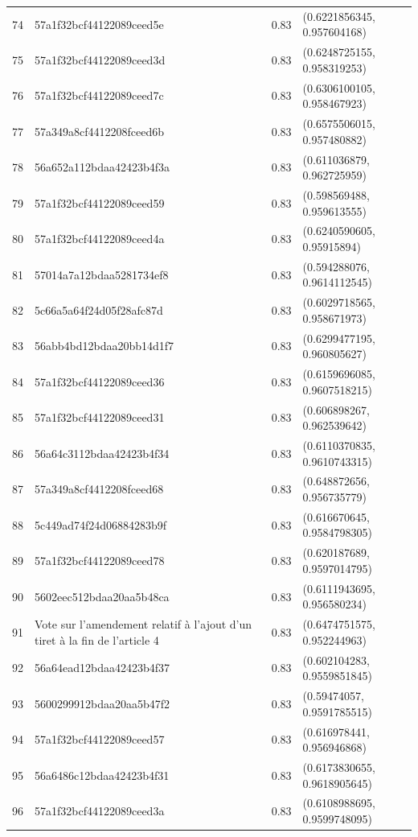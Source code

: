 \begin{table}[ht]
\begin{tabular}{rlrl}
  74 & 57a1f32bcf44122089ceed5e & 0.83 & (0.6221856345, 0.957604168) \\ 
  75 & 57a1f32bcf44122089ceed3d & 0.83 & (0.6248725155, 0.958319253) \\ 
  76 & 57a1f32bcf44122089ceed7c & 0.83 & (0.6306100105, 0.958467923) \\ 
  77 & 57a349a8cf4412208fceed6b & 0.83 & (0.6575506015, 0.957480882) \\ 
  78 & 56a652a112bdaa42423b4f3a & 0.83 & (0.611036879, 0.962725959) \\ 
  79 & 57a1f32bcf44122089ceed59 & 0.83 & (0.598569488, 0.959613555) \\ 
  80 & 57a1f32bcf44122089ceed4a & 0.83 & (0.6240590605, 0.95915894) \\ 
  81 & 57014a7a12bdaa5281734ef8 & 0.83 & (0.594288076, 0.9614112545) \\ 
  82 & 5c66a5a64f24d05f28afc87d & 0.83 & (0.6029718565, 0.958671973) \\ 
  83 & 56abb4bd12bdaa20bb14d1f7 & 0.83 & (0.6299477195, 0.960805627) \\ 
  84 & 57a1f32bcf44122089ceed36 & 0.83 & (0.6159696085, 0.9607518215) \\ 
  85 & 57a1f32bcf44122089ceed31 & 0.83 & (0.606898267, 0.962539642) \\ 
  86 & 56a64c3112bdaa42423b4f34 & 0.83 & (0.6110370835, 0.9610743315) \\ 
  87 & 57a349a8cf4412208fceed68 & 0.83 & (0.648872656, 0.956735779) \\ 
  88 & 5c449ad74f24d06884283b9f & 0.83 & (0.616670645, 0.9584798305) \\ 
  89 & 57a1f32bcf44122089ceed78 & 0.83 & (0.620187689, 0.9597014795) \\ 
  90 & 5602eec512bdaa20aa5b48ca & 0.83 & (0.6111943695, 0.956580234) \\ 
  91 & Vote sur l'amendement relatif à l'ajout d'un tiret à la fin de l'article 4 & 0.83 & (0.6474751575, 0.952244963) \\ 
  92 & 56a64ead12bdaa42423b4f37 & 0.83 & (0.602104283, 0.9559851845) \\ 
  93 & 5600299912bdaa20aa5b47f2 & 0.83 & (0.59474057, 0.9591785515) \\ 
  94 & 57a1f32bcf44122089ceed57 & 0.83 & (0.616978441, 0.956946868) \\ 
  95 & 56a6486c12bdaa42423b4f31 & 0.83 & (0.6173830655, 0.9618905645) \\ 
  96 & 57a1f32bcf44122089ceed3a & 0.83 & (0.6108988695, 0.9599748095) \\ 

\end{tabular}
\end{table}
